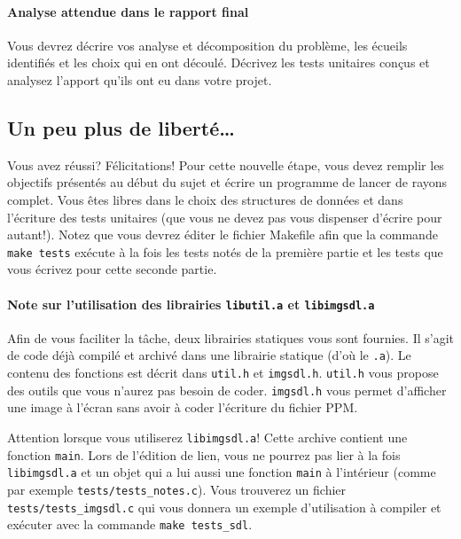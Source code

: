 \documentclass[10pt, a4paper ]{article}
\begin{document}
\paragraph{Analyse attendue dans le rapport final} Vous devrez décrire vos
analyse et décomposition du problème, les écueils identifiés et les choix qui en
ont découlé. Décrivez les tests unitaires conçus et analysez l'apport qu'ils ont
eu dans votre projet.


\subsection{Un peu plus de liberté\ldots{} }

Vous avez réussi? Félicitations! Pour cette nouvelle étape, vous devez remplir
les objectifs présentés au début du sujet et écrire un programme de lancer de
rayons complet. Vous êtes libres dans le choix des structures de données et dans
l'écriture des tests unitaires (que vous ne devez pas vous dispenser d'écrire
pour autant!). Notez que vous devrez éditer le fichier Makefile afin que la
commande \texttt{make tests} exécute à la fois les tests notés de la première
partie et les tests que vous écrivez pour cette seconde partie.

\paragraph{Note sur l'utilisation des librairies \texttt{libutil.a} et
\texttt{libimgsdl.a}} Afin de vous faciliter la tâche, deux librairies statiques
vous sont fournies. Il s'agit de code déjà compilé et archivé dans une librairie
statique (d'où le \texttt{.a}). Le contenu des fonctions est décrit dans
\texttt{util.h} et \texttt{imgsdl.h}. \texttt{util.h} vous propose des outils
que vous n'aurez pas besoin de coder. \texttt{imgsdl.h} vous permet d'afficher
une image à l'écran sans avoir à coder l'écriture du fichier PPM.

Attention lorsque vous utiliserez \texttt{libimgsdl.a}! Cette archive contient
une fonction \texttt{main}. Lors de l'édition de lien, vous ne pourrez pas lier
à la fois \texttt{libimgsdl.a} et un objet qui a lui aussi une fonction
\texttt{main} à l'intérieur (comme par exemple \texttt{tests/tests\_notes.c}).
Vous trouverez un fichier \texttt{tests/tests\_imgsdl.c} qui vous donnera un
exemple d'utilisation à compiler et exécuter avec la commande \texttt{make
tests\_sdl}.
\end{document}
